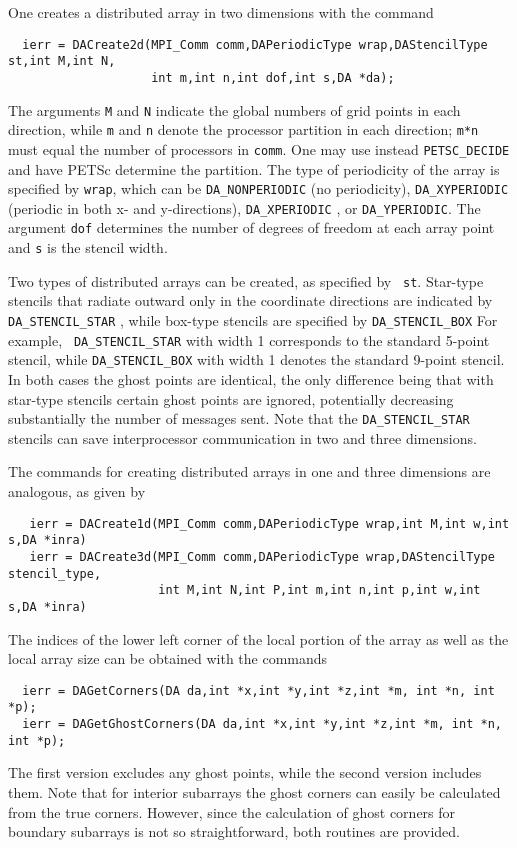 One creates a distributed array in two dimensions with the command 
\begin{verbatim}
  ierr = DACreate2d(MPI_Comm comm,DAPeriodicType wrap,DAStencilType st,int M,int N,
                    int m,int n,int dof,int s,DA *da);
\end{verbatim}
The   arguments
 {\tt M} and {\tt N} indicate the global
numbers of grid points in each direction, while {\tt m} and {\tt n}
denote the processor partition in each direction; {\tt m*n} must equal
the number of processors in {\tt comm}.  One may use instead 
{\tt PETSC\_DECIDE} and have PETSc determine the partition. The type of
periodicity of the array is specified by {\tt wrap}, which can be 
{\tt DA\_NONPERIODIC}  (no periodicity), 
{\tt DA\_XYPERIODIC}  (periodic in
both x- and y-directions), {\tt DA\_XPERIODIC} , 
or {\tt DA\_YPERIODIC}.  The argument {\tt dof} 
determines the number of degrees of freedom at each array point 
and {\tt s} is the stencil width.  

Two types of distributed arrays can be created, as specified by {\tt
st}.  Star-type stencils that radiate outward only in the coordinate
directions are indicated by {\tt DA\_STENCIL\_STAR}
, while box-type stencils are specified by
{\tt DA\_STENCIL\_BOX}  For example, {\tt
DA\_STENCIL\_STAR} with width 1 corresponds to the standard 5-point
stencil, while {\tt DA\_STENCIL\_BOX} with width 1 denotes the
standard 9-point stencil.  In both cases the ghost points are
identical, the only difference being that with star-type stencils
certain ghost points are ignored, potentially decreasing substantially
the number of messages sent.  Note that the {\tt DA\_STENCIL\_STAR}
stencils can save interprocessor communication in two and three
dimensions.

The commands for creating distributed arrays in one and three
dimensions are analogous, as given by 
\begin{verbatim}
   ierr = DACreate1d(MPI_Comm comm,DAPeriodicType wrap,int M,int w,int s,DA *inra)
   ierr = DACreate3d(MPI_Comm comm,DAPeriodicType wrap,DAStencilType stencil_type,
                     int M,int N,int P,int m,int n,int p,int w,int s,DA *inra)
\end{verbatim}

The indices of the lower left corner of the local portion of the array 
as well as the local array size can be obtained with the commands
 
\begin{verbatim}
  ierr = DAGetCorners(DA da,int *x,int *y,int *z,int *m, int *n, int *p);
  ierr = DAGetGhostCorners(DA da,int *x,int *y,int *z,int *m, int *n, int *p);
\end{verbatim}
The first version excludes any ghost points, while the second version
includes them. Note that for interior subarrays the ghost corners can
easily be calculated from the true corners.  However, since the
calculation of ghost corners for boundary subarrays is not so
straightforward, both routines are provided.


